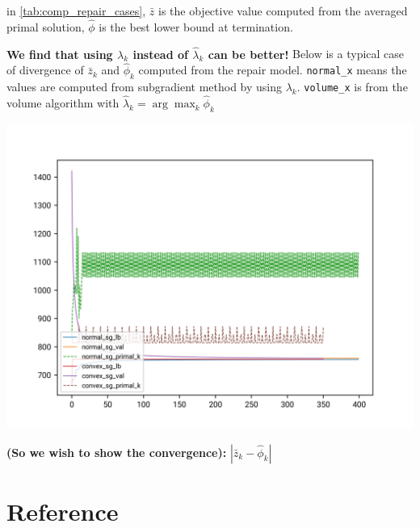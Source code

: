 \documentclass[
  a4paper,
,tablecaptionabove
]{scrartcl}
\numberwithin{equation}{section}
\begin{document}
\normalsize
in \ref{tab:comp_repair_cases}, $\bar z$ is the objective value computed from the averaged primal solution,
$\hat \phi$ is the best lower bound at termination.

\textbf{We find that using \(\lambda_{k}\) instead of
  \(\hat \lambda_{k}\) can be better!} Below is a typical case of
divergence of \(\bar z_k\) and \(\hat \phi_k\) computed from the repair
model. \texttt{normal\_x} means the values are computed from subgradient
method by using \(\lambda_{k}\). \texttt{volume\_x} is from the volume
algorithm with \(\hat \lambda_{k} = \arg\max_k \hat \phi_{k}\)

\includegraphics{imgs/conv_0_15_15.png}

\textbf{(So we wish to show the convergence):}
\(|\bar z_k -\hat \phi_k|\)

\hypertarget{sec:reference}{%
  \section*{Reference}\label{reference}}
\end{document}
